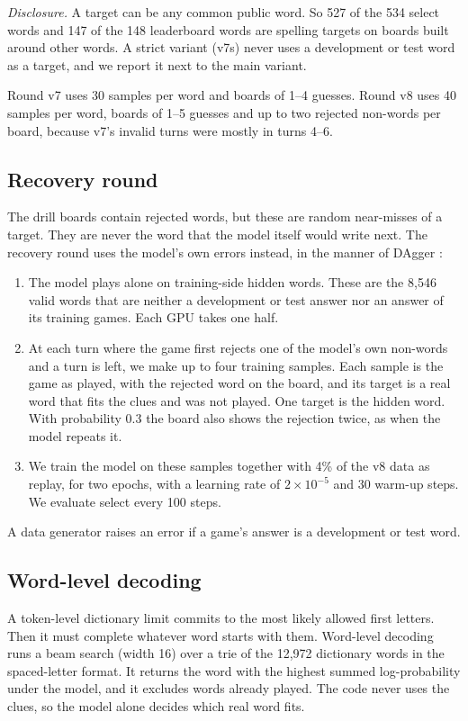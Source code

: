 \documentclass{article}
\begin{document}
\emph{Disclosure.} A target can be any common public word.
So 527 of the 534 select words and 147 of the 148 leaderboard words are spelling targets on boards built around other words.
A strict variant (v7s) never uses a development or test word as a target, and we report it next to the main variant.

Round v7 uses 30 samples per word and boards of 1--4 guesses.
Round v8 uses 40 samples per word, boards of 1--5 guesses and up to two rejected non-words per board, because v7's invalid turns were mostly in turns 4--6.

\subsection{Recovery round}
\label{sec:recovery}
The drill boards contain rejected words, but these are random near-misses of a target.
They are never the word that the model itself would write next.
The recovery round uses the model's own errors instead, in the manner of DAgger \citep{ross2011dagger}:
\begin{enumerate}
\item The model plays alone on training-side hidden words. These are the 8,546 valid words that are neither a development or test answer nor an answer of its training games. Each GPU takes one half.
\item At each turn where the game first rejects one of the model's own non-words and a turn is left, we make up to four training samples. Each sample is the game as played, with the rejected word on the board, and its target is a real word that fits the clues and was not played. One target is the hidden word. With probability 0.3 the board also shows the rejection twice, as when the model repeats it.
\item We train the model on these samples together with 4\% of the v8 data as replay, for two epochs, with a learning rate of $2\times10^{-5}$ and 30 warm-up steps. We evaluate select every 100 steps.
\end{enumerate}
A data generator raises an error if a game's answer is a development or test word.

\subsection{Word-level decoding}
\label{sec:decoding}
A token-level dictionary limit commits to the most likely allowed first letters.
Then it must complete whatever word starts with them.
Word-level decoding runs a beam search (width 16) over a trie of the 12,972 dictionary words in the spaced-letter format.
It returns the word with the highest summed log-probability under the model, and it excludes words already played.
The code never uses the clues, so the model alone decides which real word fits.
\end{document}

